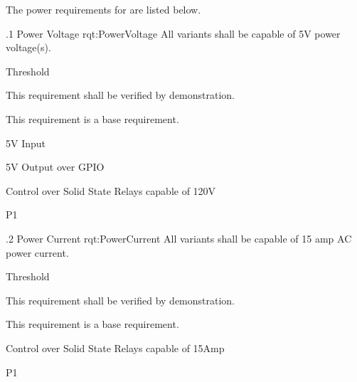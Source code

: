 The power requirements for \ThisSystem are listed below.

\ONERQMTVKPP
{\RqtNumberBase.1}
{Power Voltage}
{rqt:PowerVoltage}
{All \ThisSys variants shall be capable of 5V power voltage(s).}
{
	\item [Phase 1] Threshold
}
{This requirement shall be verified by demonstration.}
{
	\item [N/A] This requirement is a base requirement.
}
{
  \item 5V Input
  \item 5V Output over GPIO
  \item Control over Solid State Relays capable of 120V

}
{P1}

\ONERQMTVKPP
{\RqtNumberBase.2}
{Power Current}
{rqt:PowerCurrent}
{All \ThisSys variants shall be capable of 15 amp AC power current.}
{
	\item [Phase 1] Threshold
}
{This requirement shall be verified by demonstration.}
{
	\item [N/A] This requirement is a base requirement.
}
{
	\item Control over Solid State Relays capable of 15Amp
}
{P1}
